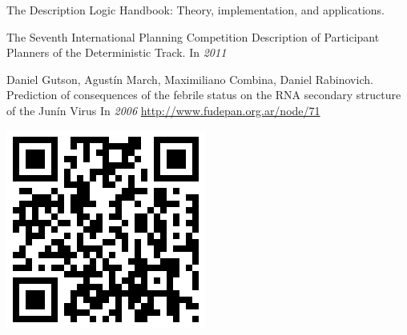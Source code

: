\documentclass[portrait,final,a0paper,fontscale=0.277]{baposter}
\begin{document}
\begin{poster}
{{\begin{thebibliography}{1}
\begin{minipage}{\linewidth}
        The Description Logic Handbook: Theory, implementation, and applications.
  		\end{minipage}
        \begin{minipage}{\linewidth}
        The Seventh International Planning Competition Description of
		Participant Planners of the Deterministic Track.	
 		In {\em 2011}
  		\end{minipage}
		\begin{minipage}{\linewidth}
		\begin{minipage}{0.85\linewidth}
      	  Daniel Gutson, Agustín March, Maximiliano Combina, Daniel Rabinovich.\\	
		  Prediction of consequences of the febrile status on the RNA secondary structure of the Junín Virus
          In {\em 2006} \url{http://www.fudepan.org.ar/node/71}
         \end{minipage}
		 \begin{minipage}{0.14\linewidth}
		  \begin{center}
		  \hfill\includegraphics[width=0.85\linewidth]{junin_qrcode}
		  \end{center}
		 \end{minipage}
		\end{minipage}
      \end{thebibliography}
    }
  }

\end{poster}
\end{document}
